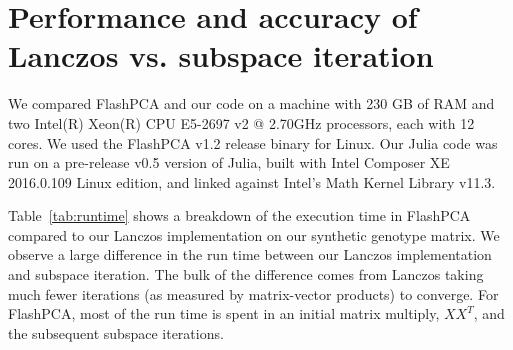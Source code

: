 \documentclass[review]{siamart0516}
\begin{document}
%
%
%
%
%


\section{Performance and accuracy of Lanczos vs. subspace iteration}

We compared FlashPCA and our code on a machine with 230 GB of RAM and two
Intel(R) Xeon(R) CPU E5-2697 v2 @ 2.70GHz processors, each with 12 cores.
We used the FlashPCA v1.2 release binary for Linux.
Our Julia code was run on a pre-release v0.5 version of Julia,
built with Intel Composer XE 2016.0.109 Linux edition,
and linked against Intel's Math Kernel Library v11.3.

Table~\ref{tab:runtime} shows a breakdown of the execution time in FlashPCA
compared to our Lanczos implementation on our synthetic genotype matrix.
We observe a large difference in the run time between our Lanczos implementation
and subspace iteration.
The bulk of the difference comes from Lanczos taking much fewer iterations
(as measured by matrix-vector products) to converge. For FlashPCA, most of the
run time is spent in an initial matrix multiply, $XX^T$, and the subsequent
subspace iterations.
\end{document}
